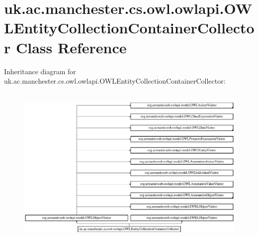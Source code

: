 \hypertarget{classuk_1_1ac_1_1manchester_1_1cs_1_1owl_1_1owlapi_1_1_o_w_l_entity_collection_container_collector}{\section{uk.\-ac.\-manchester.\-cs.\-owl.\-owlapi.\-O\-W\-L\-Entity\-Collection\-Container\-Collector Class Reference}
\label{classuk_1_1ac_1_1manchester_1_1cs_1_1owl_1_1owlapi_1_1_o_w_l_entity_collection_container_collector}
}
Inheritance diagram for uk.\-ac.\-manchester.\-cs.\-owl.\-owlapi.\-O\-W\-L\-Entity\-Collection\-Container\-Collector\-:\begin{figure}[H]
\begin{center}
\leavevmode
\includegraphics[height=7.905883cm]{classuk_1_1ac_1_1manchester_1_1cs_1_1owl_1_1owlapi_1_1_o_w_l_entity_collection_container_collector}
\end{center}
\end{figure}
